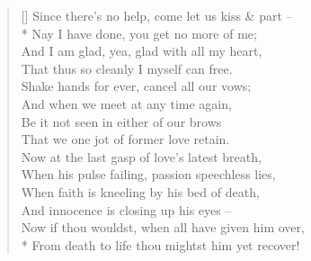 \documentclass[MAIN]{subfiles}
\begin{document}
\settowidth{\versewidth}{Since there's no help, come let us kiss \& part --}
\begin{verse}[\versewidth]
Since there's no help, come let us kiss \& part --\\*
Nay I have done, you get no more of me;\\
And I am glad, yea, glad with all my heart,\\
That thus so cleanly I myself can free.\\
Shake hands for ever, cancel all our vows;\\
And when we meet at any time again,\\
Be it not seen in either of our brows\\
That we one jot of former love retain.\\
Now at the last gasp of love's latest breath,\\
When his pulse failing, passion speechless lies,\\
When faith is kneeling by his bed of death,\\
And innocence is closing up his eyes --\\
Now if thou wouldst, when all have given him over,\\*
From death to life thou mightst him yet recover!
\end{verse}
\end{document}

